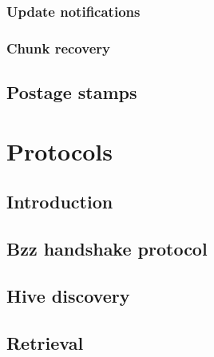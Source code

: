\subsection{Update notifications \statusred}\label{spec:format:update-notifications}
%

\subsection{Chunk recovery  \statusyellow}\label{spec:format:recovery}


\section{Postage stamps \statusorange}\label{spec:format:postage-stamps}

%


\chapter{Protocols}\label{spec:protocol}

\section{Introduction \statusorange}\label{spec:protocol:intro}


\section{Bzz handshake protocol \statusgreen}\label{spec:protocol:bzz}


\section{Hive discovery  \statusgreen}\label{spec:protocol:hive}


\section{Retrieval  \statusorange}\label{spec:protocol:retrieval}


